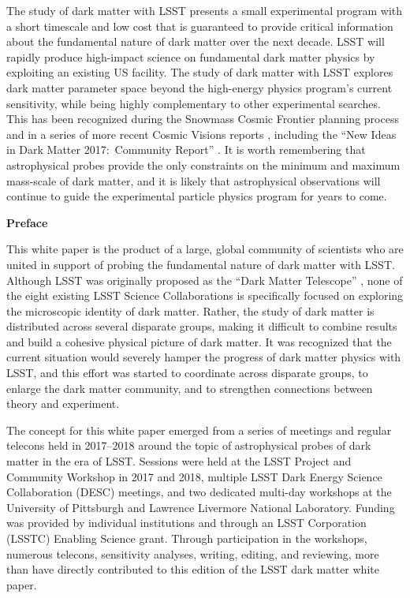 The study of dark matter with LSST presents a small experimental program with a short timescale and low cost that is guaranteed to provide critical information about the fundamental nature of dark matter over the next decade.
LSST will rapidly produce high-impact science on fundamental dark matter physics by exploiting an existing US facility. 
The study of dark matter with LSST explores dark matter parameter space beyond the high-energy physics program's current sensitivity, while being highly complementary to other experimental searches. %
This has been recognized during the Snowmass Cosmic Frontier planning process \citep[\eg,][]{1305.1605, 1310.8642, 1310.5662} and in a series of more recent Cosmic Visions reports \citep[\eg,][]{1604.07626,1802.07216}, including the ``New Ideas in Dark Matter 2017:\ Community Report'' \citep{1707.04591}.
It is worth remembering that astrophysical probes provide the only constraints on the minimum and maximum mass-scale of dark matter, and it is likely that astrophysical observations will continue to guide the  experimental particle physics program for years to come.

\clearpage

\begin{center}
  {\Large \bf Preface}
\end{center}

This white paper is the product of a large, global community of scientists who are united in support of probing the fundamental nature of dark matter with LSST.
Although LSST was originally proposed as the ``Dark Matter Telescope'' \citep{Tyson:2001}, none of the eight existing LSST Science Collaborations is specifically focused on exploring the microscopic identity of dark matter.
Rather, the study of dark matter is distributed across several disparate groups, making it difficult to combine results and build a cohesive physical picture of dark matter.
It was recognized that the current situation would severely hamper the progress of dark matter physics with LSST, and this effort was started to coordinate across disparate groups, to enlarge the dark matter community, and to strengthen connections between theory and experiment.

The concept for this white paper emerged from a series of meetings and regular telecons held in 2017--2018 around the topic of astrophysical probes of dark matter in the era of LSST.
Sessions were held at the LSST Project and Community Workshop in 2017 and 2018, multiple LSST Dark Energy Science Collaboration (DESC) meetings, and two dedicated multi-day workshops at the University of Pittsburgh and Lawrence Livermore National Laboratory.
Funding was provided by individual institutions and through an LSST Corporation (LSSTC) Enabling Science grant.
Through participation in the workshops, numerous telecons, sensitivity analyses, writing, editing, and reviewing, more than  have directly contributed to this edition of the LSST dark matter white paper.

